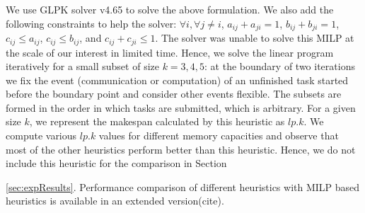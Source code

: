 \documentclass[sigconf]{acmart}
\begin{document}
	
	We use GLPK solver v4.65 to solve the above formulation. We also add the following constraints to help the solver: $\forall i, \forall j\ne i$, $a_{ij} + a_{ji}=1$, $b_{ij} + b_{ji} = 1$, $c_{ij} \le a_{ij}$, $c_{ij} \le b_{ij}$, and  $c_{ij} + c_{ji} \le 1$. The solver was unable to  solve this MILP at the scale of our interest in limited time. Hence, we solve the linear program iteratively for a small subset of size $k=3,4,5$: at the boundary of two iterations we fix the event (communication or computation) of an unfinished task started before the boundary point and consider other events flexible. The subsets are formed in the order in which tasks are submitted, which is arbitrary. For a given size $k$, we represent the makespan calculated by this heuristic as $lp.k$.
	We compute various $lp.k$ values for different memory capacities and observe that most of the other heuristics perform better than this heuristic. Hence, we do not include this heuristic for the comparison in Section~{\ref{sec:expResults}. Performance comparison of different heuristics with MILP based heuristics is available in an extended version(cite).
		
		
}
\end{document}
